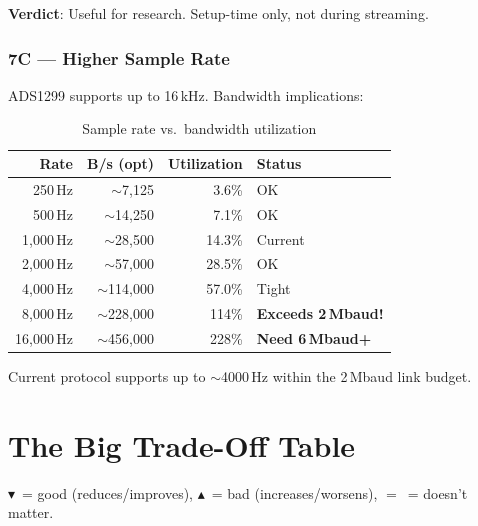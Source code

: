 \documentclass[11pt,a4paper]{article}
\newcommand{\metricdown}{$\blacktriangledown$}
\newcommand{\metricup}{$\blacktriangle$}
\newcommand{\metriceq}{$=$}
\begin{document}
\textbf{Verdict}: Useful for research. Setup-time only, not during streaming.

\subsubsection{7C --- Higher Sample Rate}

ADS1299 supports up to 16\,kHz. Bandwidth implications:

\begin{table}[H]
\centering
\begin{tabular}{|r|r|r|l|}
\hline
\textbf{Rate} & \textbf{B/s (opt)} & \textbf{Utilization} & \textbf{Status} \\\hline
\hline
250\,Hz & ${\sim}$7,125 & 3.6\% & OK \\
500\,Hz & ${\sim}$14,250 & 7.1\% & OK \\
1,000\,Hz & ${\sim}$28,500 & 14.3\% & Current \\
2,000\,Hz & ${\sim}$57,000 & 28.5\% & OK \\
4,000\,Hz & ${\sim}$114,000 & 57.0\% & Tight \\
8,000\,Hz & ${\sim}$228,000 & 114\% & \textbf{Exceeds 2\,Mbaud!} \\
16,000\,Hz & ${\sim}$456,000 & 228\% & \textbf{Need 6\,Mbaud+} \\
\hline
\end{tabular}
\caption{Sample rate vs.\ bandwidth utilization}
\end{table}

Current protocol supports up to ${\sim}$4000\,Hz within the 2\,Mbaud link budget.

\section{The Big Trade-Off Table}
\label{sec:full-matrix}

\metricdown\ = good (reduces/improves), \metricup\ = bad (increases/worsens), \metriceq\ = doesn't matter.
\end{document}
